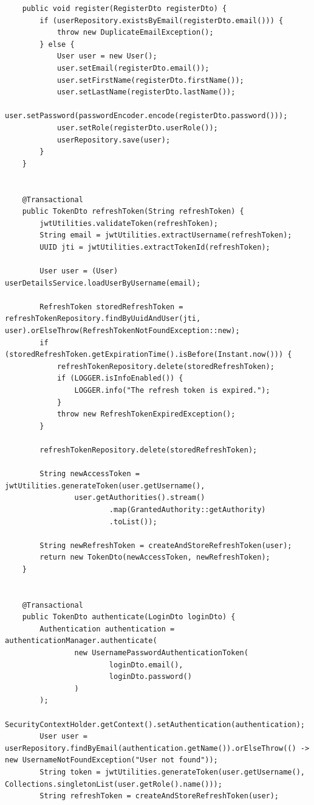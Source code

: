 \begin{lstlisting}
    public void register(RegisterDto registerDto) {
        if (userRepository.existsByEmail(registerDto.email())) {
            throw new DuplicateEmailException();
        } else {
            User user = new User();
            user.setEmail(registerDto.email());
            user.setFirstName(registerDto.firstName());
            user.setLastName(registerDto.lastName());
            user.setPassword(passwordEncoder.encode(registerDto.password()));
            user.setRole(registerDto.userRole());
            userRepository.save(user);
        }
    }


    @Transactional
    public TokenDto refreshToken(String refreshToken) {
        jwtUtilities.validateToken(refreshToken);
        String email = jwtUtilities.extractUsername(refreshToken);
        UUID jti = jwtUtilities.extractTokenId(refreshToken);

        User user = (User) userDetailsService.loadUserByUsername(email);

        RefreshToken storedRefreshToken = refreshTokenRepository.findByUuidAndUser(jti, user).orElseThrow(RefreshTokenNotFoundException::new);
        if (storedRefreshToken.getExpirationTime().isBefore(Instant.now())) {
            refreshTokenRepository.delete(storedRefreshToken);
            if (LOGGER.isInfoEnabled()) {
                LOGGER.info("The refresh token is expired.");
            }
            throw new RefreshTokenExpiredException();
        }

        refreshTokenRepository.delete(storedRefreshToken);

        String newAccessToken = jwtUtilities.generateToken(user.getUsername(),
                user.getAuthorities().stream()
                        .map(GrantedAuthority::getAuthority)
                        .toList());

        String newRefreshToken = createAndStoreRefreshToken(user);
        return new TokenDto(newAccessToken, newRefreshToken);
    }


    @Transactional
    public TokenDto authenticate(LoginDto loginDto) {
        Authentication authentication = authenticationManager.authenticate(
                new UsernamePasswordAuthenticationToken(
                        loginDto.email(),
                        loginDto.password()
                )
        );
        SecurityContextHolder.getContext().setAuthentication(authentication);
        User user = userRepository.findByEmail(authentication.getName()).orElseThrow(() -> new UsernameNotFoundException("User not found"));
        String token = jwtUtilities.generateToken(user.getUsername(), Collections.singletonList(user.getRole().name()));
        String refreshToken = createAndStoreRefreshToken(user);


\end{lstlisting}
